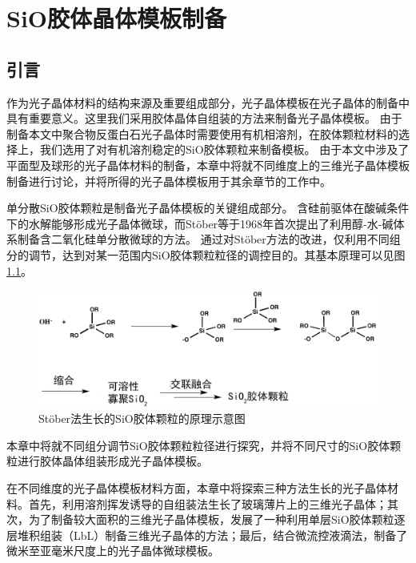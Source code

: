 
\chapter{SiO{\heiti{}}胶体晶体模板制备}
\label{ch:synth_PhC}

\section{引言}
作为光子晶体材料的结构来源及重要组成部分，光子晶体模板在光子晶体的制备中具有重要意义。这里我们采用胶体晶体自组装的方法来制备光子晶体模板。
由于制备本文中聚合物反蛋白石光子晶体时需要使用有机相溶剂，在胶体颗粒材料的选择上，我们选用了对有机溶剂稳定的SiO胶体颗粒来制备模板。
由于本文中涉及了平面型及球形的光子晶体材料的制备，本章中将就不同维度上的三维光子晶体模板制备进行讨论，并将所得的光子晶体模板用于其余章节的工作中。

单分散SiO胶体颗粒是制备光子晶体模板的关键组成部分。
含硅前驱体在酸碱条件下的水解能够形成光子晶体微球，而Stöber等于1968年首次提出了利用醇-水-碱体系制备含二氧化硅单分散微球的方法\cite{Stoeber1968Controlled}。
通过对Stöber方法的改进，仅利用不同组分的调节，达到对某一范围内SiO胶体颗粒粒径的调控目的。其基本原理可以见图\ref{fig:stoeber}。
\begin{figure}[htbp]
	\centering
	\includegraphics[width=\linewidth]{figures/ch2-stoeber.png}
	\caption{Stöber法生长的SiO胶体颗粒的原理示意图}
	\label{fig:stoeber}
\end{figure}
本章中将就不同组分调节SiO胶体颗粒粒径进行探究，并将不同尺寸的SiO胶体颗粒进行胶体晶体组装形成光子晶体模板。

在不同维度的光子晶体模板材料方面，本章中将探索三种方法生长的光子晶体材料。首先，利用溶剂挥发诱导的自组装法生长了玻璃薄片上的三维光子晶体；其次，为了制备较大面积的三维光子晶体模板，发展了一种利用单层SiO胶体颗粒逐层堆积组装（LbL）制备三维光子晶体的方法；最后，结合微流控液滴法，制备了微米至亚毫米尺度上的光子晶体微球模板。

